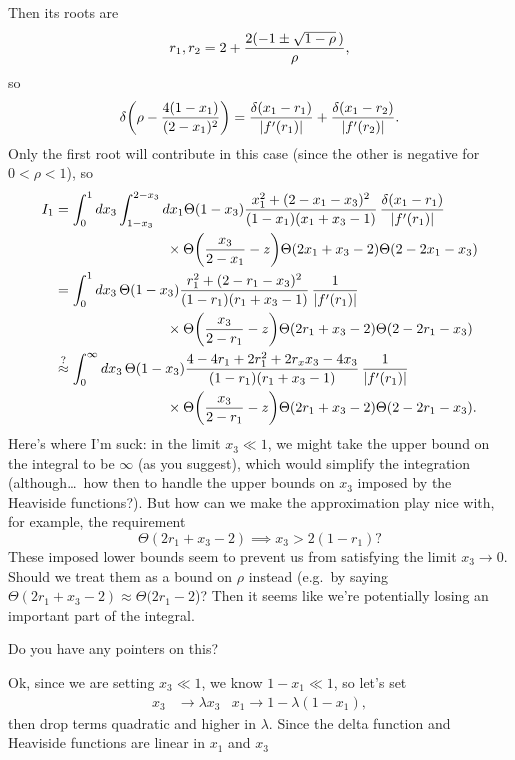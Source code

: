 \documentclass[11pt,twoside,reqno]{amsart}
\theoremstyle{plain}
\theoremstyle{remark}
\theoremstyle{definition}
\theoremstyle{remark}
\theoremstyle{definition}
\theoremstyle{definition}
\begin{document}
Then its roots are
\begin{equation}
	r_1, r_2 = 2 + \frac{2\qty(-1 \pm \sqrt{1 - \rho}\,)}{\rho},
\end{equation}
so
\begin{equation}
	\delta\qty(\rho - \frac{4(1 - x_1)}{(2 - x_1)^2}) = \frac{\delta(x_1 - r_1)}{\abs{f'(r_1)}} + \frac{\delta(x_1 - r_2)}{\abs{f'(r_2)}}.
\end{equation}
Only the first root will contribute in this case (since the other is negative for $0 < \rho < 1$), so
\begin{align}
	I_1 &= \int_0^1 dx_3 \int_{1 - x_3}^{2 - x_3} dx_1 \Theta(1 - x_3) \frac{x_1^2 + (2 - x_1 - x_3)^2}{(1 - x_1)(x_1 + x_3 - 1)} \, \frac{\delta(x_1 - r_1)}{\abs{f'(r_1)}} \\
		\nonumber&\qquad\qquad\qquad\qquad \times \Theta\qty(\frac{x_3}{2 - x_1} - z) \Theta(2x_1 + x_3 - 2)\Theta(2 - 2x_1 - x_3) \\
	&= \int_0^1 dx_3\, \Theta(1 - x_3) \frac{r_1^2 + (2 - r_1 - x_3)^2}{(1 - r_1)(r_1 + x_3 - 1)} \, \frac{1}{\abs{f'(r_1)}} \\
		\nonumber&\qquad\qquad\qquad\qquad \times \Theta\qty(\frac{x_3}{2 - r_1} - z) \Theta(2r_1 + x_3 - 2)\Theta(2 - 2r_1 - x_3) \\
	&\stackrel{?}{\approx} \int_0^\infty dx_3\, \Theta(1 - x_3) \frac{4 - 4r_1 + 2r_1^2 + 2r_x x_3 - 4x_3}{(1 - r_1)(r_1 + x_3 - 1)} \, \frac{1}{\abs{f'(r_1)}} \\
		\nonumber&\qquad\qquad\qquad\qquad \times \Theta\qty(\frac{x_3}{2 - r_1} - z) \Theta(2r_1 + x_3 - 2)\Theta(2 - 2r_1 - x_3).
\end{align}
Here's where I'm suck: in the limit $x_3 \ll 1$, we might take the upper bound on the integral to be $\infty$ (as you suggest), which would simplify the integration (although\dots\ how then to handle the upper bounds on $x_3$ imposed by the Heaviside functions?). But how can we make the approximation play nice with, for example, the requirement
\begin{equation}
	\Theta(2r_1 + x_3 - 2) \implies x_3 > 2(1 - r_1)?
\end{equation}
These imposed lower bounds seem to prevent us from satisfying the limit $x_3 \to 0$. Should we treat them as a bound on $\rho$ instead (e.g.\ by saying $\Theta(2r_1 + x_3 - 2) \approx \Theta(2r_1 - 2$)? Then it seems like we're potentially losing an important part of the integral.

Do you have any pointers on this?

\vspace{1cm}

\hrulefill

\vspace{1cm}

Ok, since we are setting $x_3 \ll 1$, we know $1 - x_1 \ll 1$, so let's set
\begin{align}
	x_3 &\to \lambda x_3 & x_1 \to 1 - \lambda(1 - x_1),
\end{align}
then drop terms quadratic and higher in $\lambda$. Since the delta function and Heaviside functions are linear in $x_1$ and $x_3$
	
\end{document}
